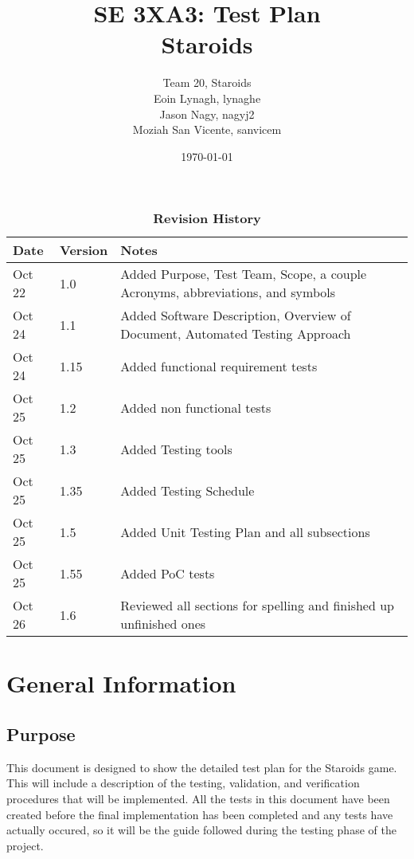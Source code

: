 \documentclass[12pt, titlepage]{article}
\title{SE 3XA3: Test Plan\\Staroids}
\author{Team 20, Staroids
		\\ Eoin Lynagh, lynaghe
		\\ Jason Nagy, nagyj2
		\\ Moziah San Vicente, sanvicem
}
\date{\today}
\begin{document}
\maketitle

\tableofcontents
\listoftables
\listoffigures

\begin{table}[h]
\caption{\bf Revision History}
\begin{tabularx}{\textwidth}{p{3cm}p{2cm}X}
\toprule {\bf Date} & {\bf Version} & {\bf Notes}\\
\midrule
Oct 22 & 1.0 & Added Purpose, Test Team, Scope, a couple Acronyms, abbreviations, and symbols\\
Oct 24 & 1.1 & Added Software Description, Overview of Document, Automated Testing Approach\\
Oct 24 & 1.15 & Added functional requirement tests\\
Oct 25 & 1.2 & Added non functional tests\\
Oct 25 & 1.3 & Added Testing tools\\
Oct 25 & 1.35 & Added Testing Schedule\\
Oct 25 & 1.5 & Added Unit Testing Plan and all subsections\\
Oct 25 & 1.55 & Added PoC tests\\
Oct 26 & 1.6 & Reviewed all sections for spelling and finished up unfinished ones\\
\bottomrule
\end{tabularx}
\end{table}

\newpage


\section{General Information}

\subsection{Purpose}
This document is designed to show the detailed test plan for the Staroids game. This will include a description of the testing, validation, and verification procedures that will be implemented. All the tests in this document have been created before the final implementation has been completed and any tests have actually occured, so it will be the guide followed during the testing phase of the project.
\end{document}

